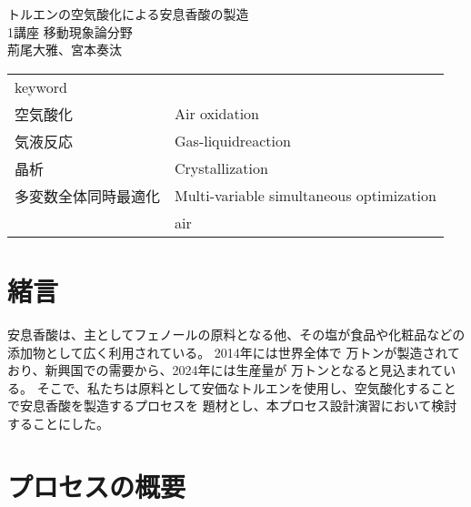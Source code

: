 \documentclass[a4j]{jsreport}
\begin{document}
\begin{titlepage}
\vspace{5cm}
\centering
{\Huge トルエンの空気酸化による安息香酸の製造}\\
\vspace{2cm}
\centering
{\Large 1講座 移動現象論分野}\\
\vspace{0.5cm}
\centering
{\large 荊尾大雅、宮本奏汰}\\
\vspace{3cm}
\begin{table}[htbp]
    \begin{center}
        \begin{tabular}[htbp]{ll}
            \multicolumn{2}{l}{{\LARGE keyword}}\\
            {\Large 空気酸化}&{\Large Air oxidation}\\
            {\Large 気液反応}&{\Large Gas-liquidreaction}\\
            {\Large 晶析}&{\Large Crystallization}\\
            {\Large 多変数全体同時最適化}&{\Large Multi-variable simultaneous optimization}\\
            {\Large }&{\Large air}\\
        \end{tabular}
    \end{center}
\end{table}

\end{titlepage}


\newpage
{}
\setcounter{tocdepth}{2}
\tableofcontents
    
\newpage

\chapter{緒言}
安息香酸は、主としてフェノールの原料となる他、その塩が食品や化粧品などの添加物として広く利用されている。
2014年には世界全体で 万トンが製造されており、新興国での需要から、2024年には生産量が 万トンとなると見込まれている。
そこで、私たちは原料として安価なトルエンを使用し、空気酸化することで安息香酸を製造するプロセスを
題材とし、本プロセス設計演習において検討することにした。

\newpage
\chapter{プロセスの概要}
\end{document}
